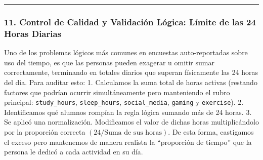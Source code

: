 \documentclass[11pt]{article}
\begin{document}
    \begin{center}\rule{0.5\linewidth}{0.5pt}\end{center}

\subsubsection{11. Control de Calidad y Validación Lógica: Límite de las
24 Horas
Diarias}\label{control-de-calidad-y-validaciuxf3n-luxf3gica-luxedmite-de-las-24-horas-diarias}

Uno de los problemas lógicos más comunes en encuestas auto-reportadas
sobre uso del tiempo, es que las personas pueden exagerar u omitir sumar
correctamente, terminando en totales diarios que superan físicamente las
24 horas del día. Para auditar esto: 1. Calculamos la suma total de
horas activas (restando factores que podrían ocurrir simultáneamente
pero manteniendo el rubro principal: \texttt{study\_hours},
\texttt{sleep\_hours}, \texttt{social\_media}, \texttt{gaming} y
\texttt{exercise}). 2. Identificamos qué alumnos rompían la regla lógica
sumando más de 24 horas. 3. Se aplicó una normalización. Modificamos el
valor de dichas horas multiplicándolo por la proporción correcta
\((24 / \text{Suma de sus horas})\). De esta forma, castigamos el exceso
pero mantenemos de manera realista la ``proporción de tiempo'' que la
persona le dedicó a cada actividad en su día.
\end{document}
